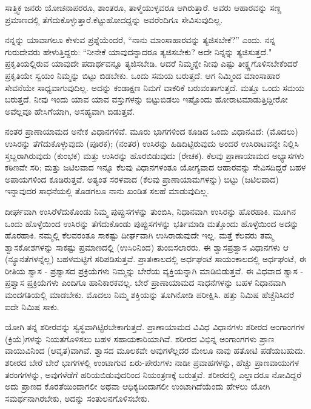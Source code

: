 ಸಾತ್ತ್ವಿಕ ಜನರು ಯೋಚನಾಪರರೂ, ಶಾಂತರೂ, ತಾಳ್ಮೆಯುಳ್ಳವರೂ ಆಗಿರುತ್ತಾರೆ. ಅವರು ಆಹಾರವನ್ನು ಸಣ್ಣ ಪ್ರಮಾಣದಲ್ಲಿ ತೆಗೆದುಕೊಳ್ಳುತ್ತಾರೆ.\break ಕೆಟ್ಟುಹೋದದ್ದನ್ನು ಅವರೆಂದಿಗೂ ಸೇವಿಸುವುದಿಲ್ಲ.

ನನ್ನನ್ನು ಯಾವಾಗಲೂ ಕೇಳುವ ಪ್ರಶ್ನೆಯೆಂದರೆ, “ನಾನು ಮಾಂಸಾಹಾರವನ್ನು ತ್ಯಜಿಸಬೇಕೆ?'' ಎಂದು. ನನ್ನ ಗುರುದೇವರು ಹೇಳುತ್ತಿದ್ದರು: “ನೀನೇಕೆ ಯಾವುದನ್ನಾದರೂ ತ್ಯಜಿಸಬೇಕು? ಅದೇ ನಿನ್ನನ್ನು ತ್ಯಜಿಸುತ್ತದೆ." ಪ್ರಕೃತಿಯಲ್ಲಿರುವ ಯಾವುದೇ ಪದಾರ್ಥವನ್ನೂ ತ್ಯಜಿಸಬೇಡಿ. ಆದರೆ ನಿಮ್ಮನ್ನೇ ನೀವು ಎಷ್ಟು ತೀಕ್ಷ್ಣಗೊಳಿಸಬೇಕೆಂದರೆ ಪ್ರಕೃತಿಯೇ ಸ್ವಯಂ ನಿಮ್ಮನ್ನು ಬಿಟ್ಟು ಬಿಡಬೇಕು. ಒಂದು ಸಮಯ ಬರುತ್ತದೆ. ಆಗ ನಿಮ್ಮಿಂದ ಮಾಂಸಾಹಾರ ಸೇವನೆಯೇ ಸಾಧ್ಯವಾಗುವುದಿಲ್ಲ. ಅದನ್ನು ಕಂಡಾಕ್ಷಣ ನಿಮಗೆ ವಾಕರಿಕೆ ಬರುವಂತಾಗುತ್ತದೆ. ಮತ್ತೂ ಒಂದು ಸಮಯ ಬರುತ್ತದೆ. ನೀವು ಇಂದು ಯಾವ ಯಾವ ವಸ್ತುಗಳನ್ನು ಬಿಟ್ಟುಬಿಡಲು ಇಷ್ಟೊಂದು ಹೋರಾಟ\break ಮಾಡುತ್ತಿದ್ದೀರೋ ಅವೆಲ್ಲವೂ ಹೇಸಿಗೆಯಾಗಿ, ಅಸಹ್ಯವಾಗಿ ಬಿಡುತ್ತವೆ.

ನಂತರ ಪ್ರಾಣಾಯಾಮದ ಅನೇಕ ವಿಧಾನಗಳಿವೆ. ಮೂರು ಭಾಗಗಳಿಂದ ಕೂಡಿದ ಒಂದು ವಿಧಾನವಿದೆ: (ಮೊದಲು) ಉಸಿರನ್ನು ತೆಗೆದುಕೊಳ್ಳುವುದು (ಪೂರಕ); (ನಂತರ) ಉಸಿರನ್ನು ಹಿಡಿದಿಟ್ಟಿರುವುದು ಅಂದರೆ ಉಸಿರಾಟವನ್ನೇ ನಿಲ್ಲಿಸಿ ಸ್ತಬ್ದರಾಗಿರುವುದು (ಕುಂಭಕ) ಮತ್ತು ಉಸಿರನ್ನು ಹೊರಬಿಡುವುದು (ರೇಚಕ). ಕೆಲವು ಪ್ರಾಣಾಯಾಮದ ಅಭ್ಯಾಸಗಳು ಕಠಿಣವೇ ಸರಿ; ಮತ್ತು ಜಟಿಲವಾದ ಇನ್ನೂ ಕೆಲವು ವಿಧಾನಗಳಂತೂ ಯೋಗ್ಯವಾದ ಆಹಾರವನ್ನು ಸೇವಿಸದಿದ್ದರೆ ಬಹಳ ಅಪಾಯಗಳಿಂದ ಕೂಡಿರುತ್ತವೆ. ಅತ್ಯಂತ ಸರಳವಾದ (ಕೆಲವು ಪ್ರಾಣಾಯಾಮಗಳನ್ನು) ಬಿಟ್ಟು (ಜಟಿಲವಾದ) ಇನ್ನಾವುದರ ಸಾಧನೆಯಲ್ಲಿ ತೊಡಗಲೂ ನಾನು ಖಂಡಿತ ಸಲಹೆ ಮಾಡುವುದಿಲ್ಲ.

ದೀರ್ಘವಾಗಿ ಉಸಿರೆಳೆದುಕೊಂಡು ನಿಮ್ಮ ಪುಪ್ಪುಸಗಳನ್ನು ತುಂಬಿಸಿ, ನಿಧಾನವಾಗಿ ಉಸಿರನ್ನು ಹೊರಹಾಕಿ. ಮೂಗಿನ ಒಂದು ಹೊಳ್ಳೆಯಿಂದ ಉಸಿರನ್ನು ತೆಗೆದುಕೊಂಡು ಪುಪ್ಪುಸಗಳನ್ನು ಭರ್ತಿಮಾಡಿ ಮತ್ತೊಂದು ಹೊಳ್ಳೆಯಿಂದ ಅದನ್ನು ಹೊರಹಾಕಿ. ನಮ್ಮಲ್ಲಿ ಕೆಲವರಂತೂ ಸಾಕಷ್ಟು ದೀರ್ಘವಾಗಿ ಉಸಿರಾಡುವುದೇ ಇಲ್ಲ. ಮತ್ತೆ ಕೆಲವರು ತಮ್ಮ ಶ್ವಾಸಕೋಶಗಳನ್ನು ಸಾಕಷ್ಟು ಪ್ರಮಾಣದಲ್ಲಿ (ಉಸಿರಿನಿಂದ) ತುಂಬಿಸಲಾರರು. ಈ ಶ್ವಾಸಪ್ರಶ್ವಾಸ ವಿಧಾನಗಳು ಆ (ನ್ಯೂನತೆಗಳನ್ನೆಲ್ಲ) ಬಹಳಮಟ್ಟಿಗೆ ಸರಿಪಡಿಸುತ್ತವೆ. ಪ್ರಾತಃಕಾಲದಲ್ಲಿ ಅರ್ಧಘಂಟೆ ಸಾಯಂಕಾಲದಲ್ಲಿ ಅರ್ಧಘಂಟೆ, ಈ ರೀತಿಯ ಶ್ವಾಸ - ಪ್ರಶ್ವಾಸದ ಪ್ರಕ್ರಿಯೆಗಳು ನಿಮ್ಮನ್ನು ಬೇರೆಯ ವ್ಯಕ್ತಿಯನ್ನಾಗಿ ಮಾಡಿಬಿಡುತ್ತವೆ. ಈ ವಿಧವಾದ ಶ್ವಾಸ - ಪ್ರಶ್ವಾಸ ಪ್ರಕ್ರಿಯೆಗಳು ಎಂದಿಗೂ ಹಾನಿಕಾರಕವಲ್ಲ. ಬೇರೆ ಪ್ರಾಣಾಯಾಮದ ಸಾಧನೆಗಳನ್ನು ಬಹಳ ನಿಧಾನವಾಗಿ ಮಂದಗತಿಯಲ್ಲಿ ಮಾಡಬೇಕು. ಮೊದಲು ನಿಮ್ಮ ಶಕ್ತಿಯನ್ನು ತೂಗಿನೋಡಿ ಪರೀಕ್ಷಿಸಿ. ಹತ್ತು ನಿಮಿಷ ಹೆಚ್ಚೆನಿಸಿದರೆ ಐದೇ ನಿಮಿಷ ಸಾಕು.

ಯೋಗಿ ತನ್ನ ಶರೀರವನ್ನು ಸ್ವಸ್ಥವಾಗಿಟ್ಟಿರಬೇಕಾಗುತ್ತದೆ. ಪ್ರಾಣಾಯಾಮದ ವಿವಿಧ ವಿಧಾನಗಳು ಶರೀರದ ಅಂಗಾಂಗಗಳ (ಕ್ರಿಯೆ)ಗಳನ್ನು ನಿಯತಗೊಳಿಸಲು ಬಹಳ ಸಹಾಯಕಾರಿಯಾಗಿವೆ. ಶರೀರದ ವಿಭಿನ್ನ ಅಂಗಾಂಗಗಳು ಪ್ರಾಣ ವಾಯುವಿನಿಂದ (ಆವೃತ)ವಾಗಿವೆ. ಶ್ವಾಸದ ಮೂಲಕವೇ ಅವುಗಳೆಲ್ಲದರ ಮೇಲೂ ನಾವು ಹತೋಟಿ ಪಡೆಯಬಹುದು. ಶರೀರದ ಬೇರೆ ಬೇರೆ ಭಾಗಗಳಲ್ಲಿ ಉಂಟಾಗುವ ಏರು-ಪೇರುಗಳು ನಾಡೀ ಪ್ರವಾಹಗಳನ್ನು, ಹೆಚ್ಚು ಪ್ರಾಣವಾಯುಗಳ ತರಂಗಗಳನ್ನು, ಅವುಗಳೆಡೆಗೆ ಹರಿಯಬಿಡುವುದರಿಂದ ನಿಯಂತ್ರಣಕ್ಕೆ ಬರುತ್ತವೆ. ಶರೀರದಲ್ಲಿ ಎಲ್ಲಾದರೂ ನೋವಿದ್ದರೆ ಅದು ಪ್ರಾಣದ ಕೊರತೆಯಿಂದಾಗಲೀ ಅಥವಾ ಆಧಿಕ್ಯದಿಂದಾಗಲೀ ಉಂಟಾಗಿದೆಯೆಂದು ಹೇಳಲು ಯೋಗಿ ಸಮರ್ಥನಾಗಿರಬೇಕು, ಅದನ್ನು ಸಂತುಲನಗೊಳಿಸಬೇಕು.

